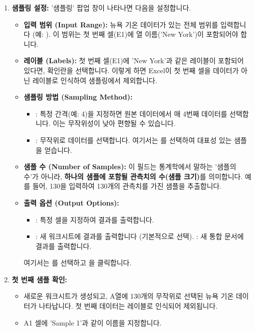 \documentclass[11pt,a4paper]{article}
\begin{document}
\begin{enumerate}
    \item \textbf{샘플링 설정:}
    '샘플링' 팝업 창이 나타나면 다음을 설정합니다.
    \begin{itemize}
        \item \textbf{입력 범위 (Input Range):} 뉴욕 기온 데이터가 있는 전체 범위를 입력합니다 (예: ). 이 범위는 첫 번째 셀(E1)에 열 이름('New York')이 포함되어야 합니다.
        \item \textbf{레이블 (Labels):} 첫 번째 셀(E1)에 'New York'과 같은 레이블이 포함되어 있다면,  확인란을 선택합니다. 이렇게 하면 Excel이 첫 번째 셀을 데이터가 아닌 레이블로 인식하여 샘플링에서 제외합니다.
        \item \textbf{샘플링 방법 (Sampling Method):}
        \begin{itemize}
            \item {}: 특정 간격(예: 4)을 지정하면 원본 데이터에서 매 4번째 데이터를 선택합니다. 이는 무작위성이 낮아 편향될 수 있습니다.
            \item {}: 무작위로 데이터를 선택합니다. 여기서는 를 선택하여 대표성 있는 샘플을 얻습니다.
        \end{itemize}
        \item \textbf{샘플 수 (Number of Samples):} 이 필드는 통계학에서 말하는 '샘플의 수'가 아니라, \textbf{하나의 샘플에 포함될 관측치의 수(샘플 크기)}를 의미합니다. 예를 들어, 130을 입력하여 130개의 관측치를 가진 샘플을 추출합니다.
        \item \textbf{출력 옵션 (Output Options):}
        \begin{itemize}
            \item {}: 특정 셀을 지정하여 결과를 출력합니다.
            \item {}: 새 워크시트에 결과를 출력합니다 (기본적으로 선택).
            : 새 통합 문서에 결과를 출력합니다.
        \end{itemize}
        여기서는 를 선택하고 을 클릭합니다.
    \end{itemize}

    \item \textbf{첫 번째 샘플 확인:}
    \begin{itemize}
        \item 새로운 워크시트가 생성되고, A열에 130개의 무작위로 선택된 뉴욕 기온 데이터가 나타납니다. 첫 번째 데이터는 레이블로 인식되어 제외됩니다.
        \item A1 셀에 'Sample 1'과 같이 이름을 지정합니다.
    \end{itemize}


\end{enumerate}
\end{document}

